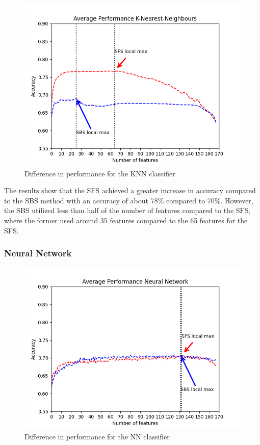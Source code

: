 \documentclass{kththesis}
\begin{document}
\begin{figure}[h!]
  \begin{center}
    \includegraphics[scale=0.8]{./figures/Figure_2.png}
    \caption{Difference in performance for the KNN classifier}
  \end{center}
\end{figure}

The results show that the SFS achieved a greater increase in accuracy compared to the SBS method with an accuracy of about 78\% compared to 70\%. However, the SBS utilized less than half of the number of features compared to the SFS, where the former used around 35 features compared to the 65 features for the SFS.


\subsubsection{Neural Network}

\begin{figure}[h!]
  \begin{center}
    \includegraphics[scale=0.8]{./figures/Figure_1.png}
    \caption{Difference in performance for the NN classifier}
    \label{fig:nn}  %
  \end{center}
\end{figure}
\end{document}
